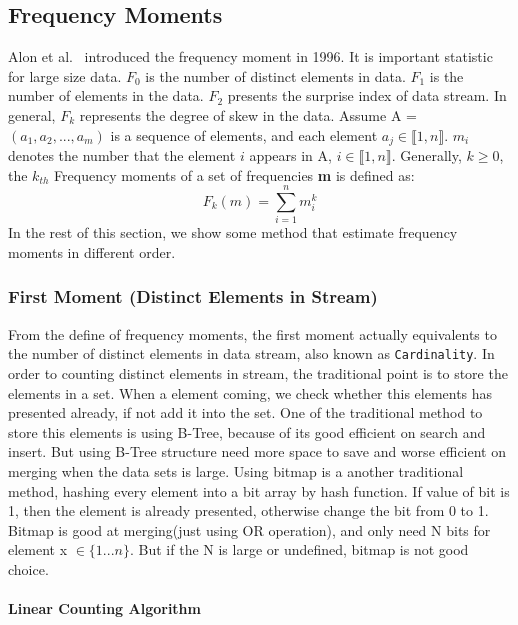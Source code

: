 \subsection{Frequency Moments}
Alon et al.~\cite{alon1999space} introduced the frequency moment in 1996. It is
important statistic for large size data. $F_0$ is the number of distinct
elements in data. $F_1$ is the number of elements in the data. $F_2$ presents
the surprise index of data stream. In general, $F_k$ represents the degree of
skew in the data. Assume A = $(a_1,a_2,...,a_m)$ is a sequence of elements, and
each element $a_j \in \llbracket1, n\rrbracket$. $m_i$ denotes the number that
the element $i$ appears in A, $i \in \llbracket1, n\rrbracket$. Generally,
$k\geqslant0$, the $k_{th}$ Frequency moments of a set of frequencies \textbf{m}
is defined as: 
\begin{equation*}
F_k(m) = \sum_{i=1}^n m_i^k     
\end{equation*}
In the rest of this section, we show some method that estimate frequency moments
in different order. 

\subsubsection{First Moment (Distinct Elements in Stream)}
From the define of frequency moments, the first moment actually equivalents to
the number of distinct elements in data stream, also known as
\texttt{Cardinality}. In order to counting distinct elements in stream, the
traditional point is to store the elements in a set. When a element coming, we
check whether this elements has presented already, if not add it into the set.
One of the traditional method to store this elements is using B-Tree, because of
its good efficient on search and insert. But using B-Tree structure need more
space to save and worse efficient on merging when the data sets is large. Using
bitmap is a another traditional method, hashing every element into a bit array
by hash function. If value of bit is 1, then the element is already presented,
otherwise change the bit from 0 to 1. Bitmap is good at merging(just using OR
operation), and only need N bits for element x $\in \{1...n\}$. But if the N is
large or undefined, bitmap is not good choice.

\paragraph{Linear Counting Algorithm}

